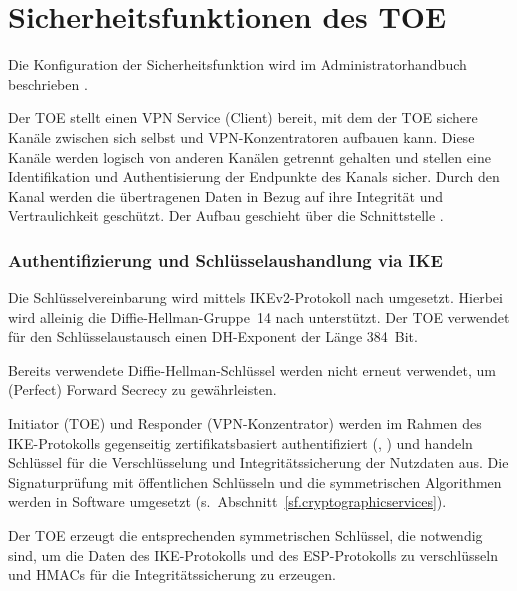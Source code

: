 \chapter{Sicherheitsfunktionen des TOE}\label{sf}



Die Konfiguration der Sicherheitsfunktion wird im Administratorhandbuch
beschrieben \autocite[Abschnitt~7.4.3.3 VPN (Virtual Private Network)]{agd_adm}.

\sfbeschreibung{}

Der TOE stellt einen VPN Service (Client) bereit, mit dem der TOE sichere Kanäle
zwischen sich selbst und VPN-Konzentratoren aufbauen kann. Diese Kanäle werden
logisch von anderen Kanälen getrennt gehalten und stellen eine Identifikation
und Authentisierung der Endpunkte des Kanals sicher.  Durch den Kanal werden die
übertragenen Daten in Bezug auf ihre Integrität und Vertraulichkeit
geschützt. Der Aufbau geschieht über die Schnittstelle \lswan{}.
 
\subsection{Authentifizierung und Schlüsselaushandlung via IKE}\label{sf.vpn.ike}

Die Schlüsselvereinbarung wird mittels IKEv2-Protokoll nach  umgesetzt. 
Hierbei wird alleinig die Diffie-Hellman-Gruppe~14 nach  unterstützt. 
Der TOE verwendet für den Schlüsselaustausch einen DH-Exponent der Länge 384~Bit.

Bereits verwendete Diffie-Hellman-Schlüssel werden nicht erneut verwendet, 
um (Perfect) Forward Secrecy zu gewährleisten.

Initiator (TOE) und Responder (VPN-Konzentrator) werden im Rahmen des
IKE-Protokolls gegenseitig zertifikatsbasiert authentifiziert
(, ) und handeln Schlüssel für die
Verschlüsselung und Integritätssicherung der Nutzdaten aus.  Die Signaturprüfung
mit öffentlichen Schlüsseln und die symmetrischen Algorithmen werden in Software
umgesetzt (s.~Abschnitt~\vref{sf.cryptographicservices}).

Der TOE erzeugt die entsprechenden symmetrischen Schlüssel, die notwendig 
sind, um die Daten des IKE-Protokolls und des ESP-Protokolls zu verschlüsseln 
und HMACs für die Integritätssicherung zu erzeugen.

